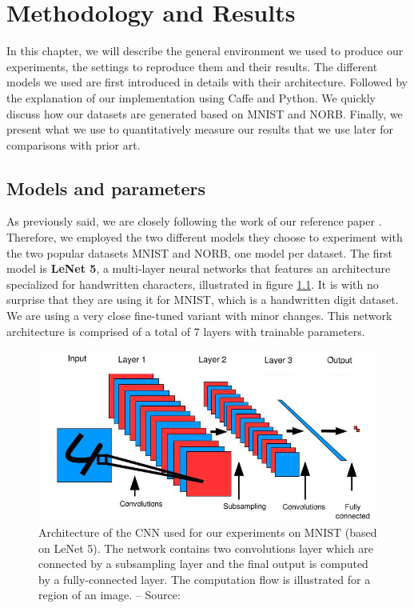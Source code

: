 \documentclass[a4paper,12pt]{report}
\begin{document}
\chapter{Methodology and Results}
\label{chap:results}

In this chapter, we will describe the general environment we used to produce our experiments, the settings to reproduce them and their results.
The different models we used are first introduced in details with their architecture.
Followed by the explanation of our implementation using Caffe and Python.
We quickly discuss how our datasets are generated based on MNIST and NORB.
Finally, we present what we use to quantitatively measure our results that we use later for comparisons with prior art.

\section{Models and parameters}

As previously said, we are closely following the work of our reference paper \cite{hadsell2006dimensionality}.
Therefore, we employed the two different models they choose to experiment with the two popular datasets MNIST and NORB, one model per dataset.
The first model is {\bf LeNet 5}, a multi-layer neural networks that features an architecture specialized for handwritten characters, illustrated in figure \ref{fig:siamese_cnn}.
It is with no surprise that they are using it for MNIST, which is a handwritten digit dataset.
We are using a very close fine-tuned variant with minor changes.
This network architecture is comprised of a total of 7 layers with trainable parameters.

\begin{figure}[t]
    \begin{center}
        \includegraphics{thesis_figures/siamese_cnn.jpg}
    \end{center}
    \caption{Architecture of the CNN used for our experiments on MNIST (based on LeNet 5). The network contains two convolutions layer which are connected by a subsampling layer and the final output is computed by a fully-connected layer. The computation flow is illustrated for a region of an image. -- Source: \cite{hadsell2006dimensionality}}
    \label{fig:siamese_cnn}
\end{figure}
\end{document}
